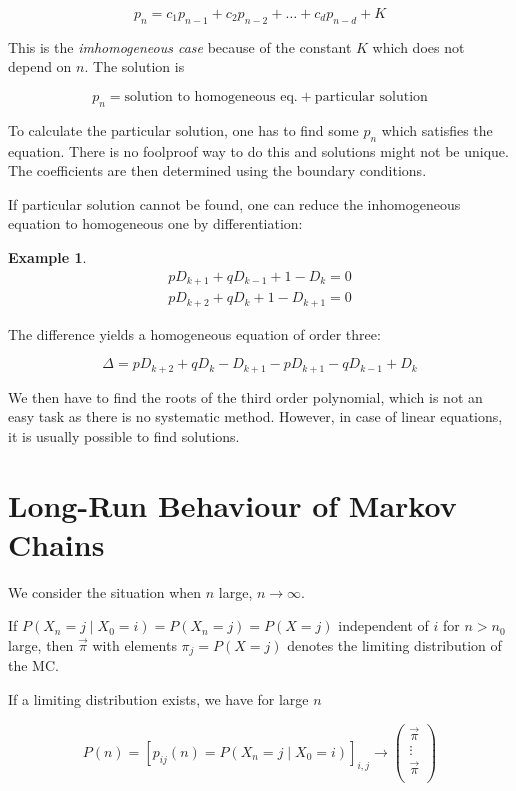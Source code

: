 \documentclass{article}
\theoremstyle{definition}
\newtheorem{exmp}{Example}[section]
\begin{document}
$$
p_n = c_1 p_{n-1} + c_2 p_{n-2} + \ldots + c_d p_{n-d} + K
$$

This is the \emph{imhomogeneous case} because of the constant $K$ which does not depend on $n$.
The solution is

$$
p_n = \text{solution to homogeneous eq.} + \text{particular solution}
$$

To calculate the particular solution, one has to find some $p_n$ which satisfies the equation. There is no foolproof way to do this and solutions might not be unique. The coefficients are then determined using the boundary conditions.

If particular solution cannot be found, one can reduce the inhomogeneous equation to homogeneous one by differentiation:

\begin{exmp}

\begin{align*}
p D_{k+1} + q D_{k-1} + 1 - D_k = 0 \\
p D_{k+2} + q D_k + 1 - D_{k+1} = 0
\end{align*}

The difference yields a homogeneous equation of order three:

$$
\Delta = p D_{k+2} + q D_k - D_{k+1} - p D_{k+1} - q D_{k-1} + D_k
$$
\end{exmp}

We then have to find the roots of the third order polynomial, which is not an easy task as there is no systematic method. However, in case of linear equations, it is usually possible to find solutions.

\section{Long-Run Behaviour of Markov Chains}
We consider the situation when $n$ large, $n \to \infty$.

If
$P \left( X_n = j \mid X_0 = i \right) = P \left( X_n = j \right) = P(X = j)$ independent of $i$ for $n > n_0$ large, then $\vec{\pi}$ with elements $\pi_j = P(X = j)$ denotes the limiting distribution of the MC.

If a limiting distribution exists, we have for large $n$

$$
P(n) = \left[ p_{ij}(n) = P(X_n=j \mid X_0 = i)  \right]_{i,j} \to \begin{pmatrix} \vec{\pi} \\ \vdots \\ \vec{\pi} \\ \end{pmatrix}
$$
\end{document}
